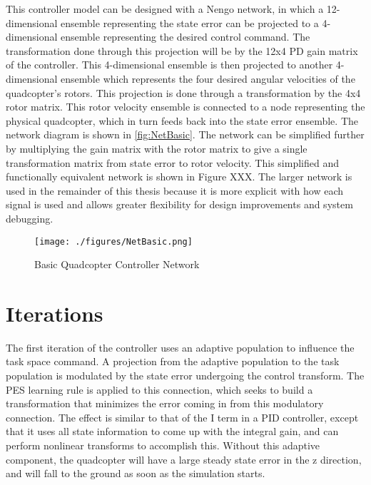 \documentclass[letterpaper,12pt,titlepage,oneside,final]{book}
\begin{document}
This controller model can be designed with a Nengo network, in which a 12-dimensional ensemble representing the state error can be projected to a 4-dimensional ensemble representing the desired control command. 
The transformation done through this projection will be by the 12x4 PD gain matrix of the controller. 
This 4-dimensional ensemble is then projected to another 4-dimensional ensemble which represents the four desired angular velocities of the quadcopter's rotors. 
This projection is done through a transformation by the 4x4 rotor matrix. 
This rotor velocity ensemble is connected to a node representing the physical quadcopter, which in turn feeds back into the state error ensemble. 
The network diagram is shown in \autoref{fig:NetBasic}. 
The network can be simplified further by multiplying the gain matrix with the rotor matrix to give a single transformation matrix from state error to rotor velocity. 
This simplified and functionally equivalent network is shown in Figure XXX.
The larger network is used in the remainder of this thesis because it is more explicit with how each signal is used and allows greater flexibility for design improvements and system debugging.

\begin{figure}
\centering
\texttt{[image: ./figures/NetBasic.png]} %
\caption{Basic Quadcopter Controller Network}
\label{fig:NetBasic}
\end{figure}

\section{Iterations}


The first iteration of the controller uses an adaptive population to influence the task space command. 
A projection from the adaptive population to the task population is modulated by the state error undergoing the control transform. 
The PES learning rule is applied to this connection, which seeks to build a transformation that minimizes the error coming in from this modulatory connection. 
The effect is similar to that of the I term in a PID controller, except that it uses all state information to come up with the integral gain, and can perform nonlinear transforms to accomplish this. Without this adaptive component, the quadcopter will have a large steady state error in the z direction, and will fall to the ground as soon as the simulation starts.
\end{document}
